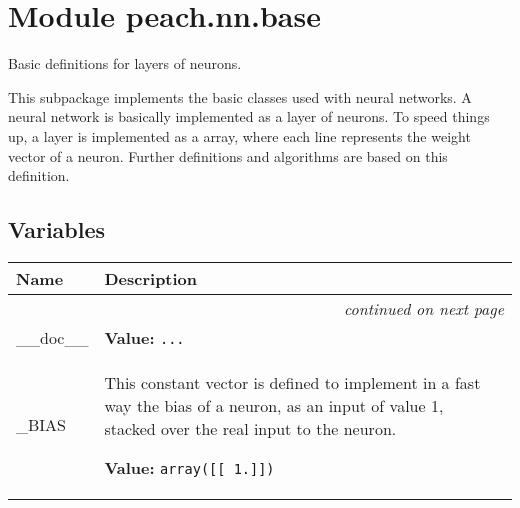 %
%
%


\section{Module peach.nn.base}

    \label{peach:nn:base}

Basic definitions for layers of neurons.

This subpackage implements the basic classes used with neural networks. A neural
network is basically implemented as a layer of neurons. To speed things up, a
layer is implemented as a array, where each line represents the weight vector
of a neuron. Further definitions and algorithms are based on this definition.


  \subsection{Variables}

\begin{longtable}{|p{}|p{}|l}
\cline{1-2}
\cline{1-2} \centering \textbf{Name} & \centering \textbf{Description}& \\
\cline{1-2}
\endhead\cline{1-2}\multicolumn{3}{r}{\small\textit{continued on next page}}\\\endfoot\cline{1-2}
\endlastfoot\raggedright \_\-\_\-d\-o\-c\-\_\-\_\- & \raggedright \textbf{Value:} 
{\tt \texttt{...}}&\\
\cline{1-2}
\raggedright \_\-B\-I\-A\-S\- & \raggedright This constant vector is defined to implement in a fast way the bias of a
neuron, as an input of value 1, stacked over the real input to the neuron.

\textbf{Value:} 
{\tt array([[ 1.]])}&\\
\cline{1-2}
\end{longtable}



